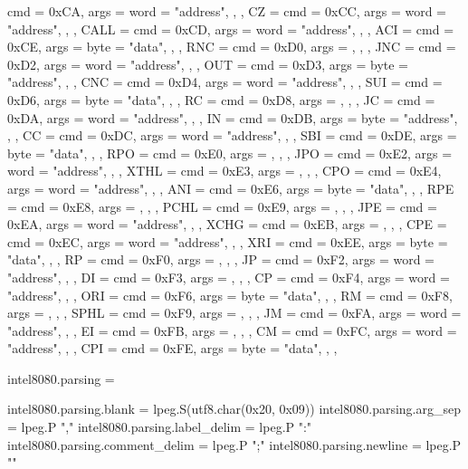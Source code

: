{{        { cmd = 0xCA, args = {{word = "address"}}, },
    },
    CZ   = {
        { cmd = 0xCC, args = {{word = "address"}}, },
    },
    CALL = {
        { cmd = 0xCD, args = {{word = "address"}}, },
    },
    ACI  = {
        { cmd = 0xCE, args = {{byte = "data"}}, },
    },
    RNC  = {
        { cmd = 0xD0, args = {}, },
    },
    JNC  = {
        { cmd = 0xD2, args = {{word = "address"}}, },
    },
    OUT  = {
        { cmd = 0xD3, args = {{byte = "address"}}, },
    },
    CNC  = {
        { cmd = 0xD4, args = {{word = "address"}}, },
    },
    SUI  = {
        { cmd = 0xD6, args = {{byte = "data"}}, },
    },
    RC   = {
        { cmd = 0xD8, args = {}, },
    },
    JC   = {
        { cmd = 0xDA, args = {{word = "address"}}, },
    },
    IN   = {
        { cmd = 0xDB, args = {{byte = "address"}}, },
    },
    CC   = {
        { cmd = 0xDC, args = {{word = "address"}}, },
    },
    SBI  = {
        { cmd = 0xDE, args = {{byte = "data"}}, },
    },
    RPO  = {
        { cmd = 0xE0, args = {}, },
    },
    JPO  = {
        { cmd = 0xE2, args = {{word = "address"}}, },
    },
    XTHL = {
        { cmd = 0xE3, args = {}, },
    },
    CPO  = {
        { cmd = 0xE4, args = {{word = "address"}}, },
    },
    ANI  = {
        { cmd = 0xE6, args = {{byte = "data"}}, },
    },
    RPE  = {
        { cmd = 0xE8, args = {}, },
    },
    PCHL = {
        { cmd = 0xE9, args = {}, },
    },
    JPE  = {
        { cmd = 0xEA, args = {{word = "address"}}, },
    },
    XCHG = {
        { cmd = 0xEB, args = {}, },
    },
    CPE  = {
        { cmd = 0xEC, args = {{word = "address"}}, },
    },
    XRI  = {
        { cmd = 0xEE, args = {{byte = "data"}}, },
    },
    RP   = {
        { cmd = 0xF0, args = {}, },
    },
    JP   = {
        { cmd = 0xF2, args = {{word = "address"}}, },
    },
    DI   = {
        { cmd = 0xF3, args = {}, },
    },
    CP   = {
        { cmd = 0xF4, args = {{word = "address"}}, },
    },
    ORI  = {
        { cmd = 0xF6, args = {{byte = "data"}}, },
    },
    RM   = {
        { cmd = 0xF8, args = {}, },
    },
    SPHL = {
        { cmd = 0xF9, args = {}, },
    },
    JM   = {
        { cmd = 0xFA, args = {{word = "address"}}, },
    },
    EI   = {
        { cmd = 0xFB, args = {}, },
    },
    CM   = {
        { cmd = 0xFC, args = {{word = "address"}}, },
    },
    CPI  = {
        { cmd = 0xFE, args = {{byte = "data"}}, },
    },
}

intel8080.parsing = {}

intel8080.parsing.blank = lpeg.S(utf8.char(0x20, 0x09))
intel8080.parsing.arg_sep = lpeg.P ","
intel8080.parsing.label_delim = lpeg.P ":"
intel8080.parsing.comment_delim = lpeg.P ";"
intel8080.parsing.newline = lpeg.P "\n"

